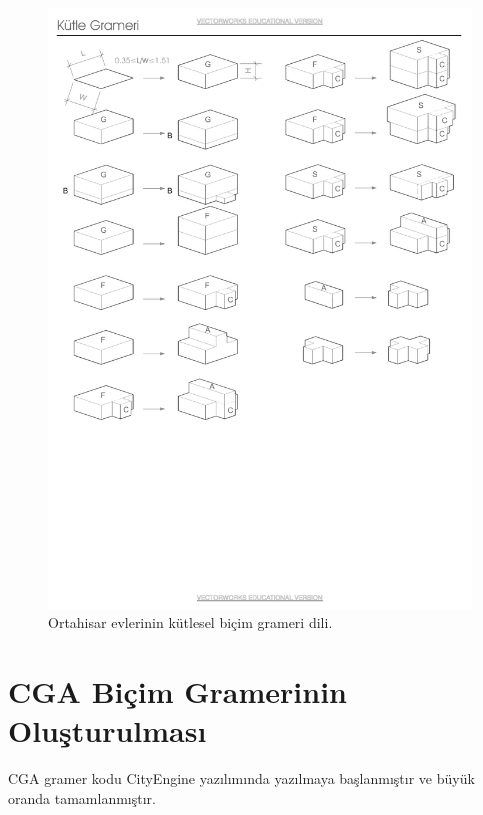 \documentclass[12pt,turkish,a4paperpaper,]{report}
\begin{document}
\begin{figure}
\centering
\includegraphics[width=1\textwidth,height=\textheight]{source/figures/bicimgrameri.pdf}
\caption{Ortahisar evlerinin kütlesel biçim grameri dili.
\label{bicimgrameri}}
\end{figure}

\hypertarget{cga-biuxe7im-gramerinin-oluux15fturulmasux131}{%
\section{CGA Biçim Gramerinin
Oluşturulması}\label{cga-biuxe7im-gramerinin-oluux15fturulmasux131}}

CGA gramer kodu CityEngine yazılımında yazılmaya başlanmıştır ve büyük
oranda tamamlanmıştır.
\end{document}
